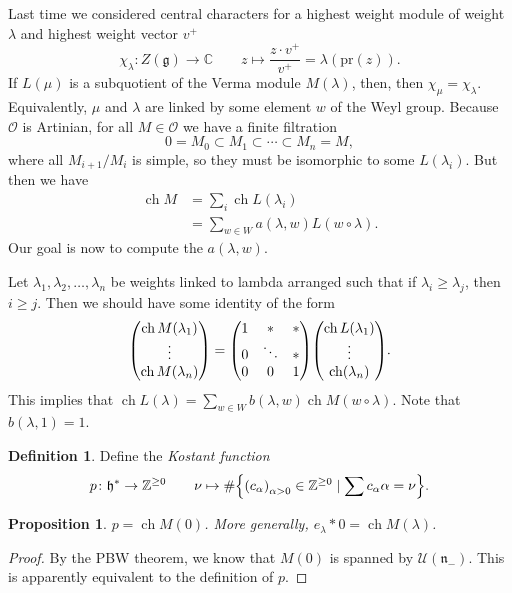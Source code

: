 \documentclass[leqno, openany]{memoir}
\newtheorem{prop}[thm]{Proposition}
\theoremstyle{definition}
\newtheorem{defn}[thm]{Definition}
\theoremstyle{remark}
\theoremstyle{plain}
\theoremstyle{definition}
\theoremstyle{remark}
\newcommand{\C}{\mathbb{C}}
\newcommand{\Z}{\mathbb{Z}}
\newcommand{\U}{\mathcal{U}}
\newcommand{\cO}{\mathcal{O}}
\newcommand{\g}{\mathfrak{g}}
\newcommand{\h}{\mathfrak{h}}
\newcommand{\n}{\mathfrak{n}}
\newcommand{\mr}[1]{\mathrm{#1}}
\DeclareMathOperator{\ch}{ch}
\begin{document}
Last time we considered central characters for a highest weight module of weight $\lambda$ and highest weight vector $v^+$
\[ \chi_{\lambda} \colon Z(\g) \to \C \qquad z \mapsto \frac{z \cdot v^+}{v^+} = \lambda(\mr{pr}(z)). \]
If $L(\mu)$ is a subquotient of the Verma module $M(\lambda)$, then, then $\chi_{\mu} = \chi_{\lambda}$. Equivalently, $\mu$ and $\lambda$ are linked by some element $w$ of the Weyl group. Because $\cO$ is Artinian, for all $M \in \cO$ we have a finite filtration
\[ 0 = M_0 \subset M_1 \subset \cdots \subset M_n = M, \]
where all $M_{i+1}/M_i$ is simple, so they must be isomorphic to some $L(\lambda_i)$. But then we have
\begin{align*}
    \ch M &= \sum_i \ch L(\lambda_i) \\
    &= \sum_{w \in W} a(\lambda, w) L(w \circ \lambda).
\end{align*}
Our goal is now to compute the $a(\lambda, w)$.

Let $\lambda_1, \lambda_2, \ldots, \lambda_n$ be weights linked to lambda arranged such that if $\lambda_i \geq \lambda_j$, then $i \geq j$. Then we should have some identity of the form
\[ \mqty(\ch M(\lambda_1) \\ \vdots \\ \ch M(\lambda_n)) = \mqty(1 & * & * \\ 0 & \ddots & * \\ 0 & 0 & 1) \mqty(\ch L(\lambda_1) \\ \vdots \\ \ch(\lambda_n)). \]
This implies that $\ch L(\lambda) = \sum_{w \in W} b(\lambda, w) \ch M(w \circ \lambda)$. Note that $b(\lambda, 1) = 1$.

\begin{defn}
    Define the \textit{Kostant function} 
    \[ p \colon \h^* \to \Z^{\geq 0} \qquad \nu \mapsto \# \qty{{(c_{\alpha})}_{\alpha > 0} \in \Z^{\geq 0} \mid \sum c_{\alpha} \alpha = \nu}. \]
\end{defn}

\begin{prop}
    $p = \ch M(0)$. More generally, $e_{\lambda} * 0 = \ch M(\lambda)$.
\end{prop}

\begin{proof}
    By the PBW theorem, we know that $M(0)$ is spanned by $\U(\n_-)$. This is apparently equivalent to the definition of $p$.
\end{proof}
\end{document}

